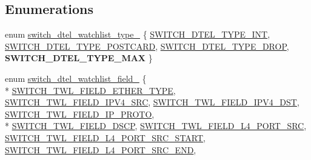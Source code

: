 \subsection*{Enumerations}
\begin{DoxyCompactItemize}
\item 
enum \hyperlink{group__DTel_ga2aef2de534e989fcfd03b3afede795f7}{switch\+\_\+dtel\+\_\+watchlist\+\_\+type\+\_\+} \{ \hyperlink{group__DTel_gga2aef2de534e989fcfd03b3afede795f7a9cf4bb618ff153d5539e1341e6e83ee1}{S\+W\+I\+T\+C\+H\+\_\+\+D\+T\+E\+L\+\_\+\+T\+Y\+P\+E\+\_\+\+I\+N\+T}, 
\hyperlink{group__DTel_gga2aef2de534e989fcfd03b3afede795f7aaa108535bdcf2aad6f39cd7cdf715f6b}{S\+W\+I\+T\+C\+H\+\_\+\+D\+T\+E\+L\+\_\+\+T\+Y\+P\+E\+\_\+\+P\+O\+S\+T\+C\+A\+R\+D}, 
\hyperlink{group__DTel_gga2aef2de534e989fcfd03b3afede795f7adbd8994e047d9751c146555766c1e833}{S\+W\+I\+T\+C\+H\+\_\+\+D\+T\+E\+L\+\_\+\+T\+Y\+P\+E\+\_\+\+D\+R\+O\+P}, 
{\bfseries S\+W\+I\+T\+C\+H\+\_\+\+D\+T\+E\+L\+\_\+\+T\+Y\+P\+E\+\_\+\+M\+A\+X}
 \}
\item 
enum \hyperlink{group__DTel_gac1ac564283da72d8f9315c73246d73a7}{switch\+\_\+dtel\+\_\+watchlist\+\_\+field\+\_\+} \{ \\*
\hyperlink{group__DTel_ggac1ac564283da72d8f9315c73246d73a7a606e2f6107c154302a6754612bbaa8b6}{S\+W\+I\+T\+C\+H\+\_\+\+T\+W\+L\+\_\+\+F\+I\+E\+L\+D\+\_\+\+E\+T\+H\+E\+R\+\_\+\+T\+Y\+P\+E}, 
\hyperlink{group__DTel_ggac1ac564283da72d8f9315c73246d73a7a5e589a3556656cb39edda7cd14b269be}{S\+W\+I\+T\+C\+H\+\_\+\+T\+W\+L\+\_\+\+F\+I\+E\+L\+D\+\_\+\+I\+P\+V4\+\_\+\+S\+R\+C}, 
\hyperlink{group__DTel_ggac1ac564283da72d8f9315c73246d73a7a9c9e0e056991ff7a68ada1c7a41169eb}{S\+W\+I\+T\+C\+H\+\_\+\+T\+W\+L\+\_\+\+F\+I\+E\+L\+D\+\_\+\+I\+P\+V4\+\_\+\+D\+S\+T}, 
\hyperlink{group__DTel_ggac1ac564283da72d8f9315c73246d73a7a925e7de38d242d15a9a93300f4fd70e7}{S\+W\+I\+T\+C\+H\+\_\+\+T\+W\+L\+\_\+\+F\+I\+E\+L\+D\+\_\+\+I\+P\+\_\+\+P\+R\+O\+T\+O}, 
\\*
\hyperlink{group__DTel_ggac1ac564283da72d8f9315c73246d73a7a1c15eb59371af377cbaa2f1fd66ddfbf}{S\+W\+I\+T\+C\+H\+\_\+\+T\+W\+L\+\_\+\+F\+I\+E\+L\+D\+\_\+\+D\+S\+C\+P}, 
\hyperlink{group__DTel_ggac1ac564283da72d8f9315c73246d73a7aa61f2c65ab9c5016a10a00cb08ddb02c}{S\+W\+I\+T\+C\+H\+\_\+\+T\+W\+L\+\_\+\+F\+I\+E\+L\+D\+\_\+\+L4\+\_\+\+P\+O\+R\+T\+\_\+\+S\+R\+C}, 
\hyperlink{group__DTel_ggac1ac564283da72d8f9315c73246d73a7a0bb9551e4c578ed08af163ad06251dcf}{S\+W\+I\+T\+C\+H\+\_\+\+T\+W\+L\+\_\+\+F\+I\+E\+L\+D\+\_\+\+L4\+\_\+\+P\+O\+R\+T\+\_\+\+S\+R\+C\+\_\+\+S\+T\+A\+R\+T}, 
\hyperlink{group__DTel_ggac1ac564283da72d8f9315c73246d73a7a1b1b19e6ddef5e26eb44586eb76581a5}{S\+W\+I\+T\+C\+H\+\_\+\+T\+W\+L\+\_\+\+F\+I\+E\+L\+D\+\_\+\+L4\+\_\+\+P\+O\+R\+T\+\_\+\+S\+R\+C\+\_\+\+E\+N\+D}, 

\end{DoxyCompactItemize}
